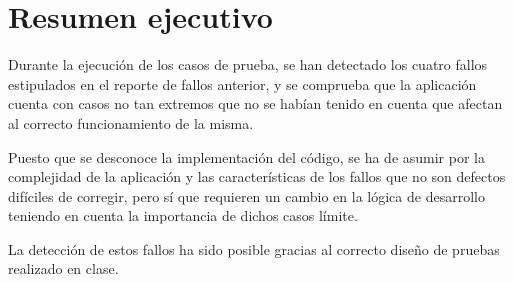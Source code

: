 \chapter{Resumen ejecutivo}
Durante la ejecución de los casos de prueba, se han detectado los cuatro fallos
estipulados en el reporte de fallos anterior, y se comprueba que la aplicación
cuenta con casos no tan extremos que no se habían tenido en cuenta que afectan
al correcto funcionamiento de la misma.

Puesto que se desconoce la implementación del código, se ha de asumir por la
complejidad de la aplicación y las características de los fallos que no son
defectos difíciles de corregir, pero sí que requieren un cambio en la lógica
de desarrollo teniendo en cuenta la importancia de dichos casos límite.

La detección de estos fallos ha sido posible gracias al correcto diseño de
pruebas realizado en clase.
